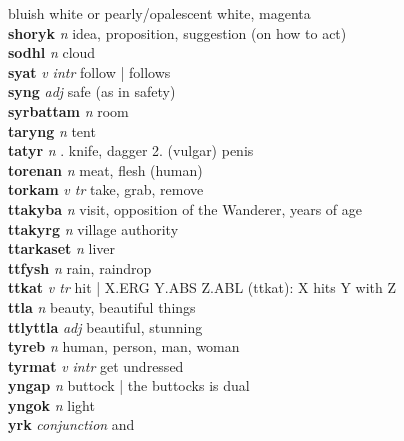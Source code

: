 bluish white or pearly/opalescent white, magenta \\\textbf{shoryk}   \emph{n} \textperiodcentered idea, proposition, suggestion (on how to act)\\\textbf{sodhl}   \emph{n} \textperiodcentered cloud\\\textbf{syat}   \emph{v intr} \textperiodcentered follow | \ABS follows \DAT\\\textbf{syng}   \emph{adj} \textperiodcentered safe (as in safety)\\\textbf{syrbattam}   \emph{n} \textperiodcentered room\\\textbf{taryng}   \emph{n} \textperiodcentered tent\\\textbf{tatyr}   \emph{n} . knife, dagger 2. (vulgar) penis \\\textbf{torenan}   \emph{n} \textperiodcentered meat, flesh (human)\\\textbf{torkam}   \emph{v tr} \textperiodcentered take, grab, remove\\\textbf{ttakyba}   \emph{n} \textperiodcentered visit, opposition of the Wanderer, years of age\\\textbf{ttakyrg}   \emph{n} \textperiodcentered village authority\\\textbf{ttarkaset}   \emph{n} \textperiodcentered liver\\\textbf{ttfysh}   \emph{n} \textperiodcentered rain, raindrop\\\textbf{ttkat}   \emph{v tr} \textperiodcentered hit | X.ERG Y.ABS Z.ABL (ttkat): X hits Y with Z\\\textbf{ttla}   \emph{n} \textperiodcentered beauty, beautiful things\\\textbf{ttlyttla}   \emph{adj} \textperiodcentered beautiful, stunning\\\textbf{tyreb}   \emph{n} \textperiodcentered human, person, man, woman\\\textbf{tyrmat}   \emph{v intr} \textperiodcentered get undressed\\\textbf{yngap}   \emph{n} \textperiodcentered buttock | the buttocks is dual\\\textbf{yngok}   \emph{n} \textperiodcentered light\\\textbf{yrk}   \emph{conjunction} \textperiodcentered and\\